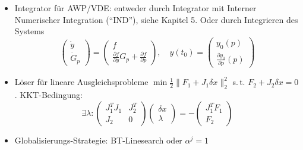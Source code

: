 \begin{itemize}
\item Integrator für AWP/VDE: entweder durch Integrator mit Interner Numerischer Integration ("`IND"'), siehe Kapitel 5. Oder durch Integrieren des Systems
\[\begin{pmatrix} \dot y \\ \dot G_p \end{pmatrix} = \begin{pmatrix} f \\ \frac{\partial f}{\partial y} G_p + \frac{\partial f}{\partial p}\end{pmatrix}, \quad y(t_0) = \begin{pmatrix} y_0(p) \\ \frac{\partial y_0}{\partial p}(p) \end{pmatrix} \]
\item Löser für lineare Ausgleichsprobleme $\min \tfrac 12 \|F_1 + J_1 \delta x\|_2^2$ s.\,t. $F_2 + J_2 \delta x = 0$. KKT-Bedingung:
\[ \exists \lambda: \begin{pmatrix} J_1^T J_1 & J_2^T \\ J_2 & 0 \end{pmatrix} \begin{pmatrix} \delta x \\ \lambda \end{pmatrix} = -\begin{pmatrix} J_1^T F_1 \\ F_2 \end{pmatrix} \]
\item Globalisierungs-Strategie: BT-Linesearch oder $\alpha^j = 1$
\end{itemize}






